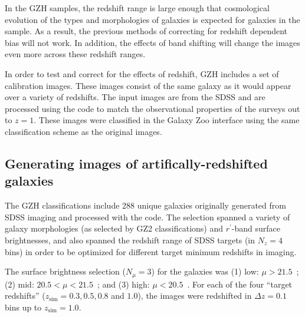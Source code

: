 \documentclass[twocolumn]{aastex6}
\begin{document}
In the GZH samples, the redshift range is large enough that cosmological evolution of the types and morphologies of galaxies is expected for galaxies in the sample. As a result, the previous methods of correcting for redshift dependent bias will not work. In addition, the effects of band shifting will change the images even more across these redshift ranges. %

In order to test and correct for the effects of redshift, GZH includes a set of calibration images. These images consist of the same galaxy as it would appear over a variety of redshifts. The input images are from the SDSS \citep{yor00,str02} and are processed using the \ferengi{} code \citep{bar08a} to match the observational properties of the \hst{} surveys out to $z=1$. These images were classified in the Galaxy Zoo interface using the same classification scheme as the original \hst{} images.
 
\subsection{Generating images of artifically-redshifted galaxies}

The GZH classifications include 288 unique galaxies originally generated from SDSS imaging and processed with the \ferengi{} code. The selection spanned a variety of galaxy morphologies (as selected by GZ2 classifications) and $r^\prime$-band surface brightnesses, and also spanned the redshift range of SDSS targets (in $N_z = 4$ bins) in order to be optimized for different target minimum redshifts in \hst{} imaging. 

The surface brightness selection ($N_\mu = 3$) for the \ferengi{} galaxies was (1) low: $\mu > 21.5$~\magarc;  (2) mid: $20.5 < \mu < 21.5$~\magarc; and (3) high: $\mu < 20.5$~\magarc. For each of the four ``target redshifts'' ($z_\mathrm{sim} = 0.3, 0.5, 0.8$ and $1.0$), the images were redshifted in $\Delta z = 0.1$ bins up to $z_\mathrm{sim}=1.0$. 
 
\end{document}
